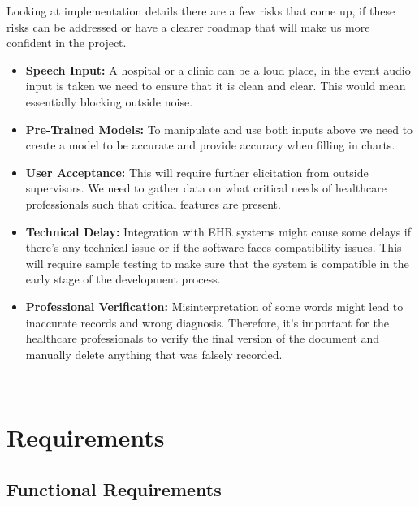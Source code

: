 \documentclass[12pt]{article}
\begin{document}
Looking at implementation details there are a few risks that come up, if these risks can be addressed or have a clearer roadmap that will make us more confident in the project. 

\begin{itemize}
  \item \textbf{Speech Input:} A hospital or a clinic can be a loud place, in the event audio input is taken we need to ensure that it is clean and clear. This would mean essentially blocking outside noise. 
  \item \textbf{Pre-Trained Models:} To manipulate and use both inputs above we need to create a model to be accurate and provide accuracy when filling in charts. 
  \item \textbf{User Acceptance:} This will require further elicitation from outside supervisors. We need to gather data on what critical needs of healthcare professionals such that critical features are present.
  \item \textbf{Technical Delay:} Integration with EHR systems might cause some delays if there’s any technical issue or if the software faces compatibility issues. This will require sample testing to make sure that the system is compatible in the early stage of the development process.
  \item \textbf{Professional Verification:} Misinterpretation of some words might lead to inaccurate records and wrong diagnosis. Therefore, it’s important for the healthcare professionals to verify the final version of the document and manually delete anything that was falsely recorded. 
\end{itemize}

~\newpage

\section{Requirements} \label{sec_Requirements}


\subsection{Functional Requirements} \label{sec_FunctionalRequirements}
\end{document}

